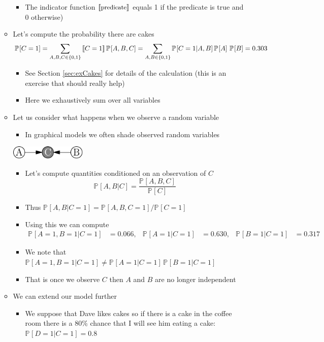 \documentclass[11pt]{article}
\newcommand{\Prob}[2][]{\mathbb{P}_{#1\!}\left[ #2 \right]}
\newcommand{\pred}[1]{\left\llbracket { \small #1} \right\rrbracket}
\begin{document}
\begin{itemize}
\begin{itemize}
\begin{itemize}
\item The indicator function \(\pred{\text{predicate}}\) equals 1
if the predicate is true and 0 otherwise)
\end{itemize}
\item Let's compute the probability there are cakes
$$ \Prob{C=1} = \sum_{A,B,C\in\{0,1\}}
       \pred{C=1} \Prob{A,B,C} = \sum_{A,B\in\{0,1\}}
       \Prob{C=1|A,B} \Prob{A}\,\Prob{B} = 0.303 $$
\begin{itemize}
\item See Section \ref{sec:exCakes} for details of the calculation
(this is an exercise that should really help)
\item Here we exhaustively sum over all variables
\end{itemize}
\item Let us consider what happens when we observe a random variable
\begin{itemize}
\item In graphical models we often shade observed random variables
\end{itemize}
\begin{center}
\includegraphics[width=0.3\textwidth]{figures/acob.pdf}
\end{center}
\begin{itemize}
\item Let's compute quantities conditioned on an observation of \(C\)
$$ \Prob{A,B|C} =\frac{\Prob{A,B,C}}{\Prob{C}} $$
\item Thus \(\Prob{A,B|C=1} = \Prob{A,B,C=1}/\Prob{C=1}\)
\item Using this we can compute
\begin{align*}
\Prob{A=1,B=1|C=1} &= 0.066, &
\Prob{A=1|C=1} &=0.630, &
\Prob{B=1|C=1} &= 0.317
 \end{align*}
\item We note that \(\Prob{A=1,B=1|C=1} \neq \Prob{A=1|C=1} \, \Prob{B=1|C=1}\)
\item That is once we observe \(C\) then \(A\) and \(B\) are no
longer independent
\end{itemize}
\item We can extend our model further
\begin{itemize}
\item We suppose that Dave likes cakes so if there is a cake in
the coffee room there is a 80\% chance that I will see
him eating a cake: \(\Prob{D=1|C=1}=0.8\)

\end{itemize}
\end{itemize}
\end{itemize}
\end{document}
